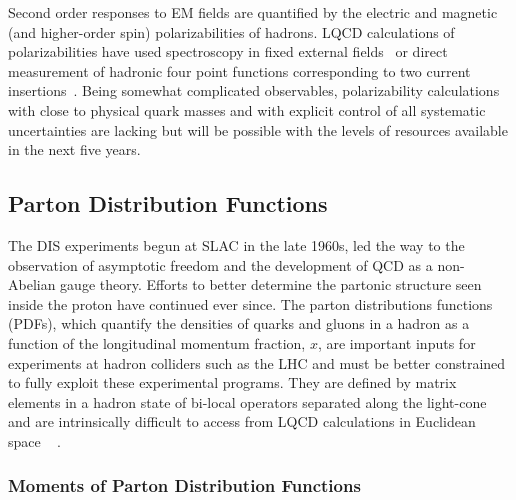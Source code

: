 Second order responses to EM fields are quantified by the electric and magnetic (and higher-order spin) polarizabilities of hadrons. LQCD calculations of polarizabilities have used spectroscopy in fixed external fields~\cite{Savage:2016kon,Shanahan:2017bgi,Tiburzi:2017iux} or direct measurement of hadronic four point functions corresponding to two current insertions~\cite{Engelhardt:2007ub}. Being somewhat complicated observables, polarizability calculations with close to physical quark masses and with explicit control of all systematic uncertainties are lacking but will be possible with the levels of resources available in the next five years.

\subsection{Parton Distribution Functions}



The DIS experiments begun at SLAC in the late 1960s, led the way to the observation of asymptotic freedom and the development of QCD as a non-Abelian gauge theory. Efforts to better determine the partonic structure seen inside the proton have continued ever since. The parton distributions functions (PDFs), which quantify the densities of quarks and gluons in a hadron as a function of the longitudinal momentum fraction, $x$, are important inputs for experiments at hadron colliders such as the LHC and must be better constrained to fully exploit these experimental programs.
They  are defined by matrix elements in a hadron state of bi-local operators separated along the light-cone and are intrinsically difficult to access from LQCD calculations in Euclidean space ~\cite{Collins:1981uw,Curci:1980uw,Baulieu:1979mr,Collins:1989gx} .


\subsubsection{Moments of Parton Distribution Functions}

